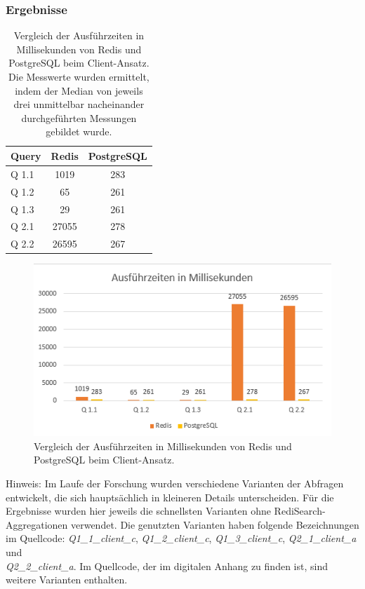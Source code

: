 \subsubsection{Ergebnisse}
\begin{table}[h]
\centering
\begin{tabular}{lcc}
\hline
Query & Redis & PostgreSQL \\ \hline
Q 1.1 & 1019  & 283       \\
Q 1.2 & 65    & 261       \\
Q 1.3 & 29    & 261       \\
Q 2.1 & 27055 & 278       \\
Q 2.2 & 26595 & 267       \\ \hline
\end{tabular}
\caption{Vergleich der Ausführzeiten in Millisekunden von Redis und PostgreSQL beim Client-Ansatz.\\
 Die Messwerte wurden ermittelt, indem der Median von jeweils drei unmittelbar nacheinander durchgeführten Messungen gebildet wurde.}
\label{tab:results-client}
\end{table}
\begin{figure}[ht]  %
    \centering      %
    \includegraphics[width=1\textwidth]{pictures/results/results-client.png}
    \caption{Vergleich der Ausführzeiten in Millisekunden von Redis und PostgreSQL beim Client-Ansatz.}      %
    \label{pic:results-client}    %
\end{figure}

Hinweis: Im Laufe der Forschung wurden verschiedene Varianten der Abfragen entwickelt, die sich hauptsächlich in kleineren Details unterscheiden. Für die Ergebnisse wurden hier jeweils die schnellsten Varianten ohne RediSearch-Aggregationen verwendet. Die genutzten Varianten haben folgende Bezeichnungen im Quellcode: \emph{Q1\_1\_client\_c}, \emph{Q1\_2\_client\_c}, \emph{Q1\_3\_client\_c}, \emph{Q2\_1\_client\_a} und\\ \emph{Q2\_2\_client\_a}.
Im Quellcode, der im digitalen Anhang zu finden ist, sind weitere Varianten enthalten. %

